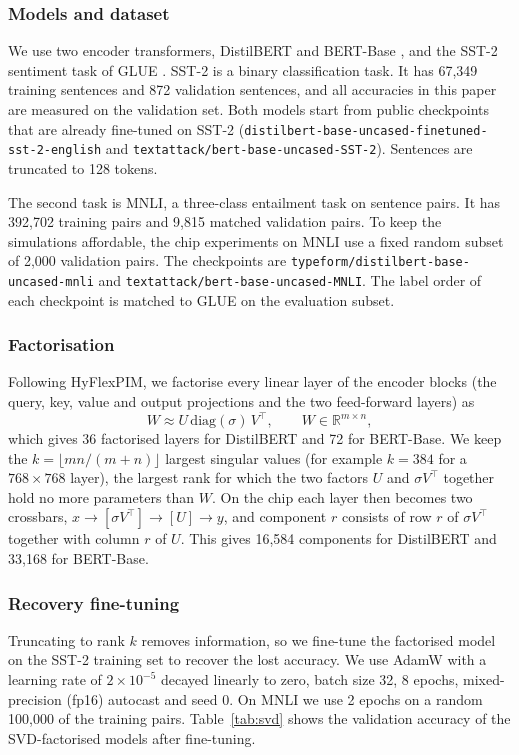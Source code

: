 \documentclass[conference]{IEEEtran}
\begin{document}
\subsubsection{Models and dataset}
We use two encoder transformers, DistilBERT \cite{sanh2019distilbert} and BERT-Base \cite{devlin2019bert},
and the SST-2 sentiment task of GLUE \cite{wang2019glue}. SST-2 is a binary classification task. It has
67,349 training sentences and 872 validation sentences, and all accuracies in this paper are measured on the
validation set. Both models start from public checkpoints that are already fine-tuned on SST-2
(\texttt{distilbert-base-uncased-}\allowbreak\texttt{finetuned-sst-2-english} and
\texttt{textattack/}\allowbreak\texttt{bert-base-uncased-SST-2}). Sentences are truncated to 128 tokens.

The second task is MNLI, a three-class entailment task on sentence pairs. It has 392,702 training pairs and
9,815 matched validation pairs. To keep the simulations affordable, the chip experiments on MNLI use a fixed
random subset of 2,000 validation pairs. The checkpoints are
\texttt{typeform/}\allowbreak\texttt{distilbert-base-uncased-mnli} and
\texttt{textattack/}\allowbreak\texttt{bert-base-uncased-MNLI}. The label order of each checkpoint is matched
to GLUE on the evaluation subset.

\subsubsection{Factorisation}
Following HyFlexPIM, we factorise every linear layer of the encoder blocks (the query, key, value and
output projections and the two feed-forward layers) as
\begin{equation}
W \approx U\,\mathrm{diag}(\sigma)\,V^{\top}, \qquad W\in\mathbb{R}^{m\times n},
\end{equation}
which gives 36 factorised layers for DistilBERT and 72 for BERT-Base. We keep the $k=\lfloor mn/(m+n)\rfloor$
largest singular values (for example $k=384$ for a $768\times768$ layer), the largest rank for which the two
factors $U$ and $\sigma V^{\top}$ together hold no more parameters than $W$. On the chip each layer then
becomes two crossbars, $x\rightarrow[\sigma V^{\top}]\rightarrow[U]\rightarrow y$, and component $r$ consists
of row $r$ of $\sigma V^{\top}$ together with column $r$ of $U$. This gives 16,584 components for DistilBERT
and 33,168 for BERT-Base.

\subsubsection{Recovery fine-tuning}
Truncating to rank $k$ removes information, so we fine-tune the factorised model on the SST-2 training set
to recover the lost accuracy. We use AdamW with a learning rate of $2\times10^{-5}$ decayed linearly to
zero, batch size 32, 8 epochs, mixed-precision (fp16) autocast and seed 0. On MNLI we use 2 epochs on a
random 100,000 of the training pairs. Table~\ref{tab:svd} shows the validation accuracy of the
SVD-factorised models after fine-tuning.
\end{document}
